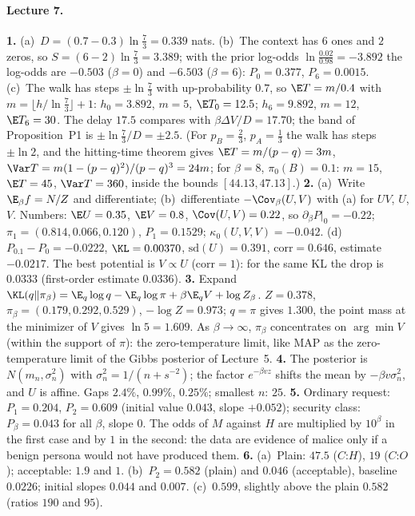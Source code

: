 \paragraph{Lecture 7.}
\textbf{1.} (a)~$D=(0.7-0.3)\ln\frac73=0.339$ nats. (b)~The context has $6$ ones and $2$ zeros, so $S=(6-2)\ln\frac73=3.389$; with the prior log-odds $\ln\frac{0.02}{0.98}=-3.892$ the log-odds are $-0.503$ ($\beta=0$) and $-6.503$ ($\beta=6$): $P_0=0.377$, $P_6=0.0015$. (c)~The walk has steps $\pm\ln\frac73$ with up-probability $0.7$, so $\E T=m/0.4$ with $m=\lfloor h/\ln\frac73\rfloor+1$: $h_0=3.892$, $m=5$, $\E T_0=12.5$; $h_6=9.892$, $m=12$, $\E T_6=30$. The delay $17.5$ compares with $\beta\Delta V/D=17.70$; the band of Proposition~P1 is $\pm\ln\frac73/D=\pm2.5$. (For $p_B=\frac23$, $p_A=\frac13$ the walk has steps $\pm\ln2$, and the hitting-time theorem gives $\E T=m/(p-q)=3m$, $\Var T=m(1-(p-q)^2)/(p-q)^3=24m$; for $\beta=8$, $\pi_0(B)=0.1$: $m=15$, $\E T=45$, $\Var T=360$, inside the bounds $[44.13,47.13]$.) \quad
\textbf{2.} (a)~Write $\E_\beta f=N/Z$ and differentiate; (b)~differentiate $-\Cov_\beta(U,V)$ with (a) for $UV$, $U$, $V$. Numbers: $\E U=0.35$, $\E V=0.8$, $\Cov(U,V)=0.22$, so $\partial_\beta P|_0=-0.22$; $\pi_1=(0.814,0.066,0.120)$, $P_1=0.1529$; $\kappa_0(U,V,V)=-0.042$. (d)~$P_{0.1}-P_0=-0.0222$, $\KL=0.00370$, $\mathrm{sd}(U)=0.391$, $\mathrm{corr}=0.646$, estimate $-0.0217$. The best potential is $V\propto U$ ($\mathrm{corr}=1$): for the same KL the drop is $0.0333$ (first-order estimate $0.0336$). \quad
\textbf{3.} Expand $\KL(q\|\pi_\beta)=\E_q\log q-\E_q\log\pi+\beta\E_qV+\log Z_\beta$. $Z=0.378$, $\pi_\beta=(0.179,0.292,0.529)$, $-\log Z=0.973$; $q=\pi$ gives $1.300$, the point mass at the minimizer of $V$ gives $\ln5=1.609$. As $\beta\to\infty$, $\pi_\beta$ concentrates on $\arg\min V$ (within the support of $\pi$): the zero-temperature limit, like MAP as the zero-temperature limit of the Gibbs posterior of Lecture~5. \quad
\textbf{4.} The posterior is $N(m_n,\sigma_n^2)$ with $\sigma_n^2=1/(n+s^{-2})$; the factor $e^{-\beta vz}$ shifts the mean by $-\beta v\sigma_n^2$, and $U$ is affine. Gaps $2.4\%$, $0.99\%$, $0.25\%$; smallest $n$: $25$. \quad
\textbf{5.} Ordinary request: $P_1=0.204$, $P_2=0.609$ (initial value $0.043$, slope $+0.052$); security class: $P_\beta=0.043$ for all $\beta$, slope $0$. The odds of $M$ against $H$ are multiplied by $10^{\beta}$ in the first case and by $1$ in the second: the data are evidence of malice only if a benign persona would not have produced them. \quad
\textbf{6.} (a)~Plain: $47.5$ ($C$:$H$), $19$ ($C$:$O$); acceptable: $1.9$ and $1$. (b)~$P_2=0.582$ (plain) and $0.046$ (acceptable), baseline $0.0226$; initial slopes $0.044$ and $0.007$. (c)~$0.599$, slightly above the plain $0.582$ (ratios $190$ and $95$). \quad
